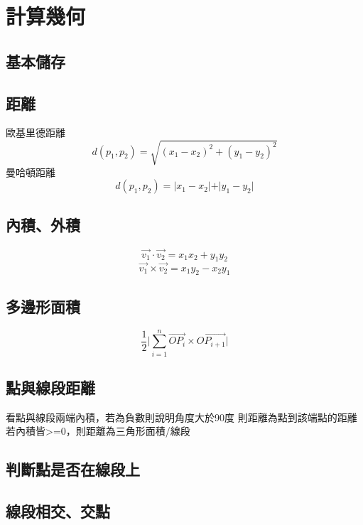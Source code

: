 \documentclass[a4paper,10pt,twocolumn,oneside]{article}
\begin{document}
\pagestyle{fancy}
\fancyfoot{}
\fancyhead[R]{\thepage}
\renewcommand{\headrulewidth}{0.4pt}
\renewcommand{\contentsname}{Contents} 

\scriptsize
\tableofcontents

\section{計算幾何}

\subsection{基本儲存}


\subsection{距離}
歐基里德距離
\[ d(p_1, p_2) = \sqrt{(x_1 - x_2)^2 + (y_1 - y_2)^2} \]
曼哈頓距離
\[ d(p_1, p_2) = \vert{x_1 - x_2}\vert + \vert{y_1 - y_2}\vert \]
\subsection{內積、外積}
\[ \vec{v_1} \cdot \vec{v_2} = {x_1}{x_2} + {y_1}{y_2} \]
\[ \vec{v_1} \times \vec{v_2} = {x_1}{y_2} - {x_2}{y_1} \]
\subsection{多邊形面積}
\[ \frac{1}{2}\vert\sum\limits_{i=1}^n \overrightarrow{OP_i} \times \overrightarrow{OP_{i+1}}\vert \]
\subsection{點與線段距離}
看點與線段兩端內積，若為負數則說明角度大於90度
則距離為點到該端點的距離
若內積皆>=0，則距離為三角形面積/線段
\subsection{判斷點是否在線段上}


\subsection{線段相交、交點}

\end{document}
